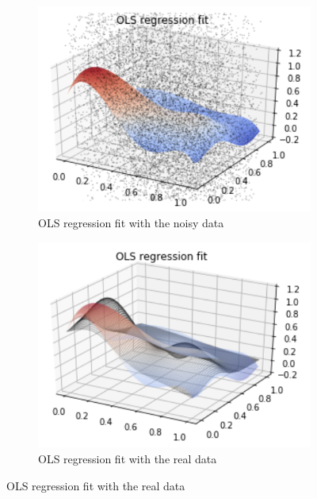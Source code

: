 \documentclass[12pt]{extarticle}
\begin{document}
\begin{figure}
    \centering
    \begin{subfigure}{.5\textwidth}
        \centering
        \includegraphics[width=.85\linewidth]{1}
        \caption{OLS regression fit with the noisy data}
        \label{fig:f3sub1}
    \end{subfigure}%
    \begin{subfigure}{.5\textwidth}
        \centering
        \includegraphics[width=.85\linewidth]{2}
        \caption{OLS regression fit with the real data}
        \label{fig:f3sub2}
    \end{subfigure}
    \label{fig:f3}
\end{figure}

\end{document}
